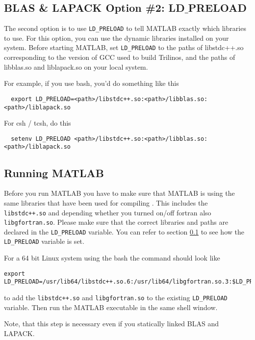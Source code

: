 \subsection{BLAS \& LAPACK Option \#2: LD$\_$PRELOAD}
\label{sec:preload}
The second option is to use \texttt{LD\_PRELOAD} to tell MATLAB exactly
which libraries to use.  For this option, you can use the dynamic
libraries installed on your system.
Before starting MATLAB, set
\texttt{LD\_PRELOAD} to the paths of libstdc++.so corresponding to the version of GCC used
to build Trilinos, and the paths of libblas.so and liblapack.so on your local system.

For example, if you use bash, you'd do something like this
\begin{lstlisting}
  export LD_PRELOAD=<path>/libstdc++.so:<path>/libblas.so:<path>/liblapack.so
  \end{lstlisting}

For csh / tcsh, do this
\begin{lstlisting}
  setenv LD_PRELOAD <path>/libstdc++.so:<path>/libblas.so:<path>/liblapack.so
\end{lstlisting}

\subsection{Running MATLAB}

Before you run MATLAB you have to make sure that MATLAB is using the same libraries that have been used for compiling \muemex.
This includes the \texttt{libstdc++.so} and depending whether you turned on/off fortran also \texttt{libgfortran.so}. Please make sure that the correct libraries and paths are declared in the \texttt{LD\_PRELOAD} variable. You can refer to section \ref{sec:preload} to see how the \texttt{LD\_PRELOAD} variable is set.

For a 64 bit Linux system using the bash the command should look like

\begin{lstlisting}
export LD_PRELOAD=/usr/lib64/libstdc++.so.6:/usr/lib64/libgfortran.so.3:$LD_PRELOAD
\end{lstlisting}

to add the \texttt{libstdc++.so} and \texttt{libgfortran.so} to the existing \texttt{LD\_PRELOAD} variable. Then run the MATLAB executable in the same shell window.

\begin{mycomment}
Note, that this step is necessary even if you statically linked BLAS and LAPACK.
\end{mycomment}

